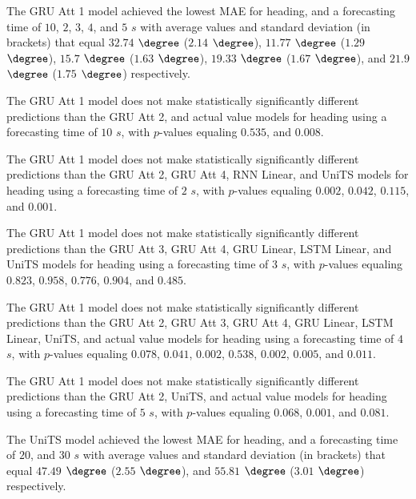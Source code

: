 The GRU Att 1 model achieved the lowest MAE for heading, and a forecasting time of $10$, $2$, $3$, $4$, and $5$ $s$ with average values and standard deviation (in brackets) that equal $32.74$ $\degree$ ($2.14$ $\degree$), $11.77$ $\degree$ ($1.29$ $\degree$), $15.7$ $\degree$ ($1.63$ $\degree$), $19.33$ $\degree$ ($1.67$ $\degree$), and $21.9$ $\degree$ ($1.75$ $\degree$) respectively.

The GRU Att 1 model does not make statistically significantly different predictions than the GRU Att 2, and actual value models for heading using a forecasting time of $10$ $s$, with $p$-values equaling $0.535$, and $0.008$.

The GRU Att 1 model does not make statistically significantly different predictions than the GRU Att 2, GRU Att 4, RNN Linear, and UniTS models for heading using a forecasting time of $2$ $s$, with $p$-values equaling $0.002$, $0.042$, $0.115$, and $0.001$.

The GRU Att 1 model does not make statistically significantly different predictions than the GRU Att 3, GRU Att 4, GRU Linear, LSTM Linear, and UniTS models for heading using a forecasting time of $3$ $s$, with $p$-values equaling $0.823$, $0.958$, $0.776$, $0.904$, and $0.485$.


The GRU Att 1 model does not make statistically significantly different predictions than the GRU Att 2, GRU Att 3, GRU Att 4, GRU Linear, LSTM Linear, UniTS, and actual value models for heading using a forecasting time of $4$ $s$, with $p$-values equaling $0.078$, $0.041$, $0.002$, $0.538$, $0.002$, $0.005$, and $0.011$.


The GRU Att 1 model does not make statistically significantly different predictions than the GRU Att 2, UniTS, and actual value models for heading using a forecasting time of $5$ $s$, with $p$-values equaling $0.068$, $0.001$, and $0.081$.

The UniTS model achieved the lowest MAE for heading, and a forecasting time of $20$, and $30$ $s$ with average values and standard deviation (in brackets) that equal $47.49$ $\degree$ ($2.55$ $\degree$), and $55.81$ $\degree$ ($3.01$ $\degree$) respectively.

